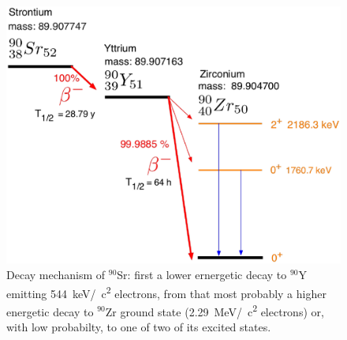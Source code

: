   \begin{figure}
  \centering
  	\includegraphics[width = 0.5 \textwidth]{graphics/cobalt/Sr90_decay.eps}
  	\caption[Cobalt decay mechanisms]{Decay mechanism of $^{90}$Sr: first a lower ernergetic decay to $^{90}$Y emitting \SI{544}{\kilo\electronvolt}/\SI{}{\square c} electrons, from that most probably a higher energetic decay to $^{90}$Zr ground state (\SI{2.29}{\mega\electronvolt}/\SI{}{\square c} electrons) or, with low probabilty, to one of two of its excited states.}
  \end{figure}

